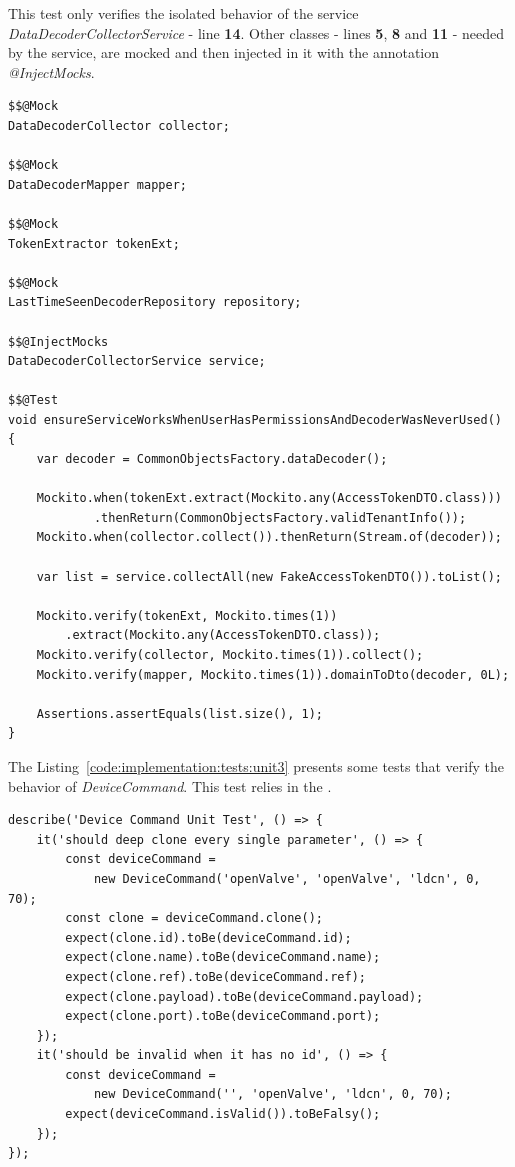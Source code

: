 This test only verifies the isolated behavior of the service \textit{DataDecoderCollectorService} - line \textbf{14}. Other classes - lines \textbf{5}, \textbf{8} and \textbf{11} - needed by the service, are mocked and then injected in it with the annotation \textit{@InjectMocks}.

\begin{lstlisting}[style=Java, caption=Unit Test - Data Decoder Backend Container, label={code:implementation:tests:unit2}]
$$@Mock
DataDecoderCollector collector;

$$@Mock
DataDecoderMapper mapper;

$$@Mock
TokenExtractor tokenExt;

$$@Mock
LastTimeSeenDecoderRepository repository;

$$@InjectMocks
DataDecoderCollectorService service;

$$@Test
void ensureServiceWorksWhenUserHasPermissionsAndDecoderWasNeverUsed() {
    var decoder = CommonObjectsFactory.dataDecoder();

    Mockito.when(tokenExt.extract(Mockito.any(AccessTokenDTO.class)))
            .thenReturn(CommonObjectsFactory.validTenantInfo());
    Mockito.when(collector.collect()).thenReturn(Stream.of(decoder));

    var list = service.collectAll(new FakeAccessTokenDTO()).toList();

    Mockito.verify(tokenExt, Mockito.times(1))
        .extract(Mockito.any(AccessTokenDTO.class));
    Mockito.verify(collector, Mockito.times(1)).collect();
    Mockito.verify(mapper, Mockito.times(1)).domainToDto(decoder, 0L);

    Assertions.assertEquals(list.size(), 1);
}
\end{lstlisting}

The Listing~\ref{code:implementation:tests:unit3} presents some tests that verify the behavior of \textit{DeviceCommand}. This test relies in the .

\begin{lstlisting}[style=javascript, caption=Unit Test - Device Management Frontend Model Library, label={code:implementation:tests:unit3}]
describe('Device Command Unit Test', () => {
    it('should deep clone every single parameter', () => {
        const deviceCommand =
            new DeviceCommand('openValve', 'openValve', 'ldcn', 0, 70);
        const clone = deviceCommand.clone();
        expect(clone.id).toBe(deviceCommand.id);
        expect(clone.name).toBe(deviceCommand.name);
        expect(clone.ref).toBe(deviceCommand.ref);
        expect(clone.payload).toBe(deviceCommand.payload);
        expect(clone.port).toBe(deviceCommand.port);
    });
    it('should be invalid when it has no id', () => {
        const deviceCommand =
            new DeviceCommand('', 'openValve', 'ldcn', 0, 70);
        expect(deviceCommand.isValid()).toBeFalsy();
    });
});
\end{lstlisting}


